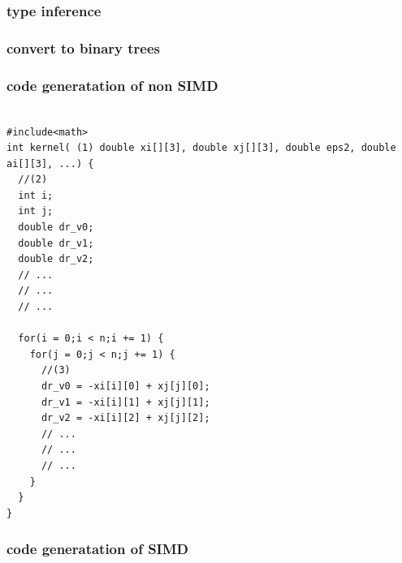 \documentclass[ams, a4j]{U-AizuGT}
\begin{document}
\subsubsection{type inference}
\subsubsection{convert to binary trees}

\subsubsection{code generatation of non SIMD}

\begin{lstlisting}[frame=single, caption=hoge]

#include<math>
int kernel( (1) double xi[][3], double xj[][3], double eps2, double ai[][3], ...) {
  //(2)
  int i;
  int j;
  double dr_v0;
  double dr_v1;
  double dr_v2;
  // ... 
  // ... 
  // ... 

  for(i = 0;i < n;i += 1) {
    for(j = 0;j < n;j += 1) {
      //(3)
      dr_v0 = -xi[i][0] + xj[j][0];
      dr_v1 = -xi[i][1] + xj[j][1];
      dr_v2 = -xi[i][2] + xj[j][2];
      // ... 
      // ... 
      // ... 
    }
  }
}
\end{lstlisting}
  

\subsubsection{code generatation of SIMD}
\end{document}
